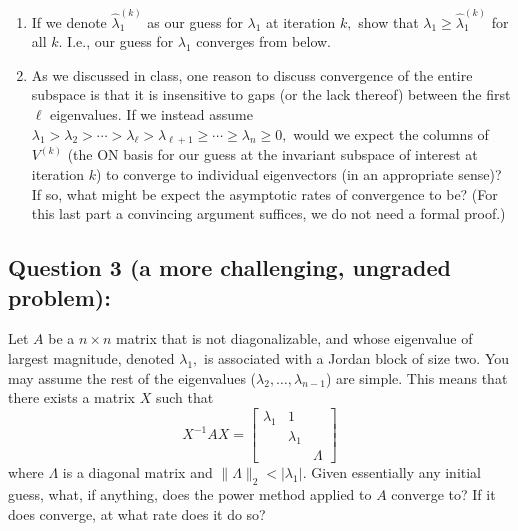 \documentclass[11pt,onecolumn]{article}
\begin{document}
\begin{enumerate}[label=(\alph*)]
\item If we denote $\hat{\lambda}_1^{(k)}$ as our guess for $\lambda_1$ at iteration $k,$ show that $\lambda_1 \geq \hat{\lambda}_1^{(k)}$ for all $k.$ I.e., our guess for $\lambda_1$ converges from below.
\item As we discussed in class, one reason to discuss convergence of the entire subspace is that it is insensitive to gaps (or the lack thereof) between the first $\ell$ eigenvalues. If we instead assume $\lambda_1 > \lambda_2 > \cdots > \lambda_\ell > \lambda_{\ell+1}\geq \cdots \geq \lambda_n \geq 0,$ would we expect the columns of $V^{(k)}$ (the ON basis for our guess at the invariant subspace of interest at iteration $k$) to converge to individual eigenvectors (in an appropriate sense)? If so, what might be expect the asymptotic rates of convergence to be? (For this last part a convincing argument suffices, we do not need a formal proof.)
\end{enumerate}

\subsection*{Question 3 (a more challenging, ungraded problem):}
Let $A$ be a $n\times n$ matrix that is not diagonalizable, and whose eigenvalue of largest magnitude, denoted $\lambda_1,$ is associated with a Jordan block of size two. You may assume the rest of the eigenvalues ($\lambda_2,\ldots,\lambda_{n-1}$) are simple. This means that there exists a matrix $X$ such that 
\[
X^{-1}AX = \begin{bmatrix}\lambda_1 & 1 & \\ & \lambda_1 & \\ & & \Lambda \end{bmatrix}
\]
where $\Lambda$ is a diagonal matrix and $\|\Lambda\|_2<\lvert \lambda_1\rvert.$ Given essentially any initial guess, what, if anything, does the power method applied to $A$ converge to? If it does converge, at what rate does it do so? 
\end{document}
